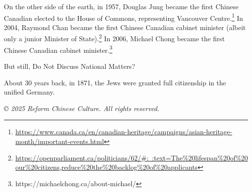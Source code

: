 \documentclass[8pt]{article}
\begin{document}
On the other side of the earth, in 1957, Douglas Jung became the first Chinese Canadian elected to the House of Commons, representing Vancouver Centre.\footnote{\href{https://www.canada.ca/en/canadian-heritage/campaigns/asian-heritage-month/important-events.html}{https://www.canada.ca/en/canadian-heritage/campaigns/asian-heritage-month/important-events.html}} In 2004, Raymond Chan became the first Chinese Canadian cabinet minister (albeit only a junior Minister of State).\footnote{\href{https://openparliament.ca/politicians/62/\#:~:text=The\%20lifespan\%20of\%20our\%20citizens,reduce\%20the\%20backlog\%20of\%20applicants}{https://openparliament.ca/politicians/62/\#:~:text=The\%20lifespan\%20of\%20our\%20citizens,reduce\%20the\%20backlog\%20of\%20applicants}} In 2006, Michael Chong became the first Chinese Canadian cabinet minister.\footnote{https://michaelchong.ca/about-michael/}

But still, Do Not Discuss National Matters?

About 30 years back, in 1871, the Jews were granted full citizenship in the unified Germany.

\vspace{2cm}

\begin{center}
    \textit{© 2025 Reform Chinese Culture. All rights reserved.}
\end{center}
\end{document}
